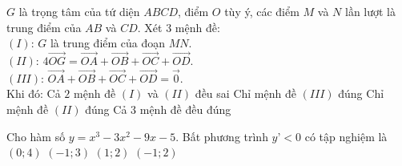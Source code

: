 \begin{ex}%
	$G$ là trọng tâm của tứ diện $ABCD$, điểm $O$ tùy ý, các điểm $M$ và $N$ lần lượt là trung điểm của $AB$ và $CD$. Xét $3$ mệnh đề:\\
	$(I)$: $G$ là trung điểm của đoạn $MN$.\\
	$(II)$: $4\overrightarrow{OG}=\overrightarrow{OA}+\overrightarrow{OB}+\overrightarrow{OC}+\overrightarrow{OD}$.\\
	$(III)$: $\overrightarrow{OA}+\overrightarrow{OB}+\overrightarrow{OC}+\overrightarrow{OD}=\overrightarrow{0}$.\\ 
	Khi đó:
	\choice
	{Cả $2$ mệnh đề $(I)$ và $(II)$ đều sai}
	{Chỉ mệnh đề $(III)$ đúng}
	{Chỉ mệnh đề $(II)$ đúng}
	{\True Cả $3$ mệnh đề đều đúng}
\end{ex}

\begin{ex}%
Cho hàm số $y=x^3-3x^2-9x-5$. Bất phương trình $y’<0$ có tập nghiệm là
	\choice
	{$\left( 0;4 \right)$}
	{\True $\left( -1;3 \right)$}
	{$\left( 1;2 \right)$}
	{$\left( -1;2 \right)$}
\end{ex}

